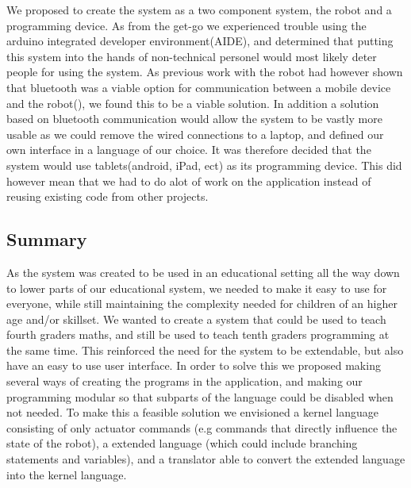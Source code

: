 
\bigskip\noindent
We proposed to create the system as a two component system, the \chirp robot and a programming device. 
As from the get-go we experienced trouble using the arduino integrated developer environment(AIDE), and determined that putting this system into the hands of non-technical personel would most likely deter people for using the system. 
As previous work with the robot had however shown that bluetooth was a viable option for communication between a mobile device and the robot(\cite{chrip2013ResearcherNight}), we found this to be a viable solution.
In addition a solution based on bluetooth communication would allow the system to be vastly more usable as we could remove the wired connections to a laptop, and defined our own interface in a language of our choice.
It was therefore decided that the system would use tablets(android, iPad, ect) as its programming device. This did however mean that we had to do alot of work on the application instead of reusing existing code from other projects. 

\subsection{Summary}
As the system was created to be used in an educational setting all the way down to lower parts of our educational system, 
we needed to make it easy to use for everyone, while still maintaining the complexity needed for children of an higher age and/or skillset. 
We wanted to create a system that could be used to teach fourth graders maths, and still be used to teach tenth graders programming at the same time. This reinforced the need for the system to be extendable, but also have an easy to use user interface. 
In order to solve this we proposed making several ways of creating the programs in the application, and making our programming modular so that subparts of the language could be disabled when not needed. To make this a feasible solution we envisioned a kernel language consisting of only actuator commands (e.g commands that directly influence the state of the robot), a extended language (which could include branching statements and variables), and a translator able to convert the extended language into the kernel language.
	
